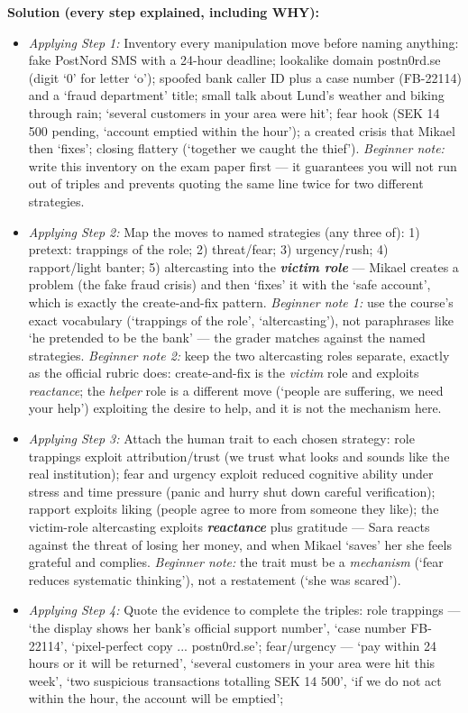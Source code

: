 \documentclass[12pt, a4paper]{article}
\newcommand{\term}[1]{\textbf{\textit{#1}}}        %
\begin{document}
\textbf{Solution (every step explained, including WHY):}
\begin{itemize}
    \item \textit{Applying Step 1:} Inventory every manipulation move before naming anything: fake PostNord SMS with a 24-hour deadline; lookalike domain postn0rd.se (digit `0' for letter `o'); spoofed bank caller ID plus a case number (FB-22114) and a `fraud department' title;
    small talk about Lund's weather and biking through rain; `several customers in your area were hit'; fear hook (SEK 14 500 pending, `account emptied within the hour'); a created crisis that Mikael then `fixes';
    closing flattery (`together we caught the thief'). \emph{Beginner note:} write this inventory on the exam paper first --- it guarantees you will not run out of triples and prevents quoting the same line twice for two different strategies.
    \item \textit{Applying Step 2:} Map the moves to named strategies (any three of): 1) pretext: trappings of the role; 2) threat/fear; 3) urgency/rush; 4) rapport/light banter; 5) altercasting into the \term{victim role} --- Mikael creates a problem (the fake fraud crisis) and then `fixes' it with the `safe account', which is exactly the create-and-fix pattern.
    \emph{Beginner note 1:} use the course's exact vocabulary (`trappings of the role', `altercasting'), not paraphrases like `he pretended to be the bank' --- the grader matches against the named strategies.
    \emph{Beginner note 2:} keep the two altercasting roles separate, exactly as the official rubric does: create-and-fix is the \emph{victim} role and exploits \emph{reactance}; the \emph{helper} role is a different move (`people are suffering, we need your help') exploiting the desire to help, and it is not the mechanism here.
    \item \textit{Applying Step 3:} Attach the human trait to each chosen strategy: role trappings exploit attribution/trust (we trust what looks and sounds like the real institution); fear and urgency exploit reduced cognitive ability under stress and time pressure (panic and hurry shut down careful verification);
    rapport exploits liking (people agree to more from someone they like); the victim-role altercasting exploits \term{reactance} plus gratitude --- Sara reacts against the threat of losing her money, and when Mikael `saves' her she feels grateful and complies.
    \emph{Beginner note:} the trait must be a \emph{mechanism} (`fear reduces systematic thinking'), not a restatement (`she was scared').
    \item \textit{Applying Step 4:} Quote the evidence to complete the triples: role trappings --- `the display shows her bank's official support number', `case number FB-22114', `pixel-perfect copy ... postn0rd.se'; fear/urgency --- `pay within 24 hours or it will be returned', `several customers in your area were hit this week', `two suspicious transactions totalling SEK 14 500', `if we do not act within the hour, the account will be emptied';

\end{itemize}
\end{document}
